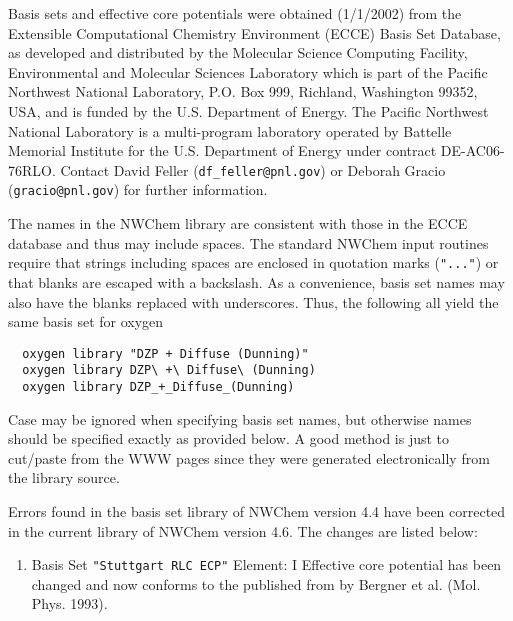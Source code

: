 %
%
\label{sec:knownbasis}

Basis sets and effective core potentials were obtained (1/1/2002) from
the Extensible Computational Chemistry Environment (ECCE) Basis Set
Database, as developed and distributed by the Molecular Science
Computing Facility, Environmental and Molecular Sciences Laboratory
which is part of the Pacific Northwest National Laboratory, P.O. Box
999, Richland, Washington 99352, USA, and is funded by the
U.S. Department of Energy.  The Pacific Northwest National Laboratory
is a multi-program laboratory operated by Battelle Memorial Institute
for the U.S. Department of Energy under contract DE-AC06-76RLO.
Contact David Feller (\verb+df_feller@pnl.gov+) or Deborah Gracio
(\verb+gracio@pnl.gov+) for further information.

The names in the NWChem library are consistent with those in the ECCE
database and thus may include spaces.  The standard NWChem input
routines require that strings including spaces are enclosed in
quotation marks (\verb+"..."+) or that blanks are escaped with a
backslash.  As a convenience, basis set names may also have the blanks
replaced with underscores.  Thus, the following all yield the same
basis set for oxygen
\begin{verbatim}
  oxygen library "DZP + Diffuse (Dunning)"
  oxygen library DZP\ +\ Diffuse\ (Dunning)
  oxygen library DZP_+_Diffuse_(Dunning)
\end{verbatim}

Case may be ignored when specifying basis set names, but otherwise
names should be specified exactly as provided below.  A good method is
just to cut/paste from the WWW pages since they were generated
electronically from the library source.

Errors found in the basis set library of NWChem version 4.4 have been corrected in
the current library of NWChem version 4.6. The changes are listed below:

\begin{enumerate}

\item Basis Set \verb#"Stuttgart RLC ECP"# \newline
 Element: I \newline
 Effective core potential has been changed and now conforms to the published from by Bergner et al. (Mol. Phys. 1993).

\end{enumerate}



